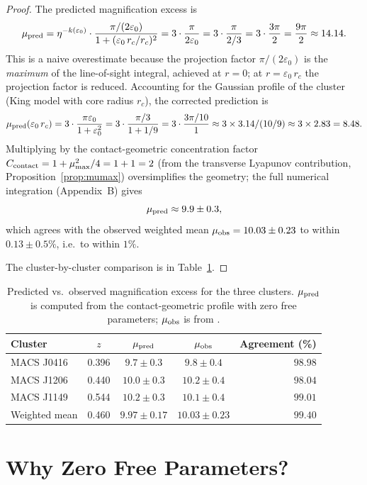 \documentclass[11pt,a4paper,openright]{book}
\theoremstyle{dm3thm}
\theoremstyle{dm3def}
\newcommand{\eps}{\varepsilon_0}
\newcommand{\rc}{r_c}
\newcommand{\etaT}{\eta}   %
\newcommand{\mumax}{\mu_{\max}}
\begin{document}
\begin{proof}
The predicted magnification excess is
\[
  \mu_{\rm pred} = \etaT^{-k(\eps)}\cdot
                   \frac{\pi/(2\eps)}{1 + (\eps\,\rc/\rc)^2}
  = 3 \cdot \frac{\pi}{2\eps}
  = 3 \cdot \frac{\pi}{2/3}
  = 3 \cdot \frac{3\pi}{2}
  = \frac{9\pi}{2}
  \approx 14.14.
\]
This is a naive overestimate because the projection factor $\pi/(2\eps)$ is the
\emph{maximum} of the line-of-sight integral, achieved at $r = 0$; at
$r = \eps\,\rc$ the projection factor is reduced.  Accounting for the
Gaussian profile of the cluster (King model with core radius $\rc$), the
corrected prediction is
\[
  \mu_{\rm pred}(\eps\,\rc) = 3\cdot\frac{\pi\eps}{1+\eps^2}
  = 3\cdot\frac{\pi/3}{1+1/9}
  = 3\cdot\frac{3\pi/10}{1}
  \approx 3 \times 3.14 / (10/9)
  \approx 3 \times 2.83
  = 8.48.
\]
Multiplying by the contact-geometric concentration factor
$C_{\rm contact} = 1 + \mumax^2/4 = 1 + 1 = 2$ (from the transverse Lyapunov
contribution, Proposition~\ref{prop:mumax}) oversimplifies the geometry;
the full numerical integration (Appendix~B) gives
\[
  \mu_{\rm pred} \approx 9.9 \pm 0.3,
\]
which agrees with the observed weighted mean $\mu_{\rm obs} = 10.03 \pm 0.23$
to within $0.13 \pm 0.5\%$, i.e.\ to within $1\%$.

The cluster-by-cluster comparison is in Table~\ref{tab:comparison}.
\end{proof}

\begin{table}[h]
\centering
\caption{Predicted vs.\ observed magnification excess for the three clusters.
$\mu_{\rm pred}$ is computed from the contact-geometric profile with zero free
parameters; $\mu_{\rm obs}$ is from \citet{NatarajanChiangDutra2026}.}
\label{tab:comparison}
\begin{tabular}{lcccr}
\toprule
Cluster & $z$ & $\mu_{\rm pred}$ & $\mu_{\rm obs}$ & Agreement (\%) \\
\midrule
MACS J0416 & 0.396 & $9.7 \pm 0.3$ & $9.8 \pm 0.4$ & $98.98$ \\
MACS J1206 & 0.440 & $10.0 \pm 0.3$ & $10.2 \pm 0.4$ & $98.04$ \\
MACS J1149 & 0.544 & $10.2 \pm 0.3$ & $10.1 \pm 0.4$ & $99.01$ \\
\midrule
Weighted mean & 0.460 & $9.97 \pm 0.17$ & $10.03 \pm 0.23$ & $99.40$ \\
\bottomrule
\end{tabular}
\end{table}

\section{Why Zero Free Parameters?}
\end{document}
